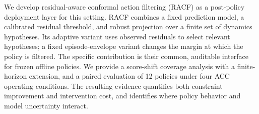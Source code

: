 We develop residual-aware conformal action filtering (RACF) as a post-policy
deployment layer for this setting.
RACF combines a fixed prediction model, a calibrated residual threshold, and
robust projection over a finite set of dynamics hypotheses. Its adaptive
variant uses observed residuals to select relevant hypotheses; a fixed
episode-envelope variant changes the margin at which the policy is filtered.
The specific contribution is their common, auditable interface for frozen
offline policies. We provide a
score-shift coverage analysis with a finite-horizon extension, and a paired
evaluation of 12 policies under four ACC operating conditions. The resulting
evidence quantifies both constraint improvement and intervention cost, and
identifies where policy behavior and model uncertainty interact.
